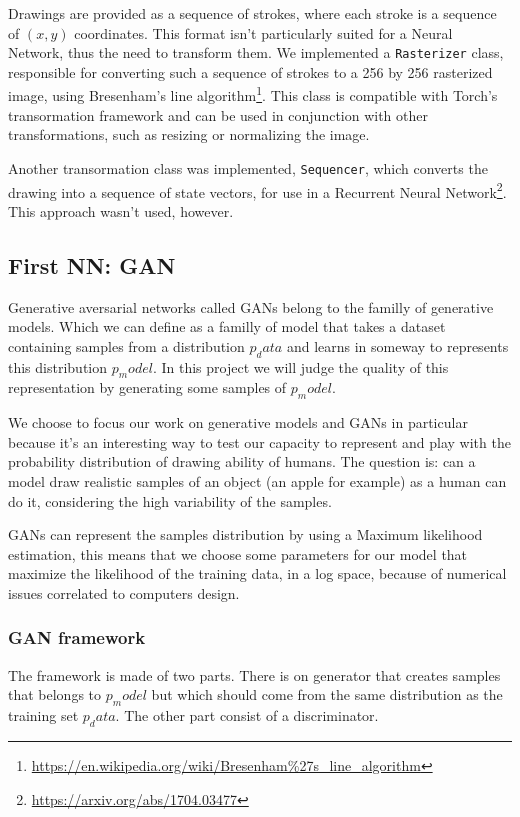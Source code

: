 \documentclass[
  10pt, 
  a4paper,
  oneside, 
  headinclude, 
  footinclude, 
  BCOR5mm, 
]{scrartcl}
\begin{document}
Drawings are provided as a sequence of strokes, where each stroke is a sequence
of $(x, y)$ coordinates. This format isn't particularly suited for a Neural
Network, thus the need to transform them. We implemented a \texttt{Rasterizer}
class, responsible for converting such a sequence of strokes to a 256 by 256
rasterized image, using Bresenham's line
algorithm\footnote{\url{https://en.wikipedia.org/wiki/Bresenham\%27s_line_algorithm}}.
This class is compatible with Torch's transormation framework and can be used in
conjunction with other transformations, such as resizing or normalizing the image.

Another transormation class was implemented, \texttt{Sequencer}, which converts
the drawing into a sequence of state vectors, for use in a Recurrent Neural
Network\footnote{\url{https://arxiv.org/abs/1704.03477}}. This approach wasn't
used, however.

\subsection{First NN: GAN}

Generative aversarial networks called GANs belong to the familly of generative models. Which we can define as a familly of model that takes a dataset containing samples from a distribution $p_data$ and learns in someway to represents this distribution $p_model$. In this project we will judge the quality of this representation by generating some samples of $p_model$.

We choose to focus our work on generative models and GANs in particular because it's an interesting way to test our capacity to represent and play with the probability distribution of drawing ability of humans. The question is: can a model draw realistic samples of an object (an apple for example) as a human can do it, considering the high variability of the samples.

GANs can represent the samples distribution by using a Maximum likelihood estimation, this means that we choose some parameters for our model that maximize the likelihood of the training data, in a log space, because of numerical issues correlated to computers design.

\subsubsection{GAN framework}
The framework is made of two parts. There is on generator that creates samples that belongs to $p_model$ but which should come from the same distribution as the training set $p_data$. The other part consist of a discriminator.
\end{document}
